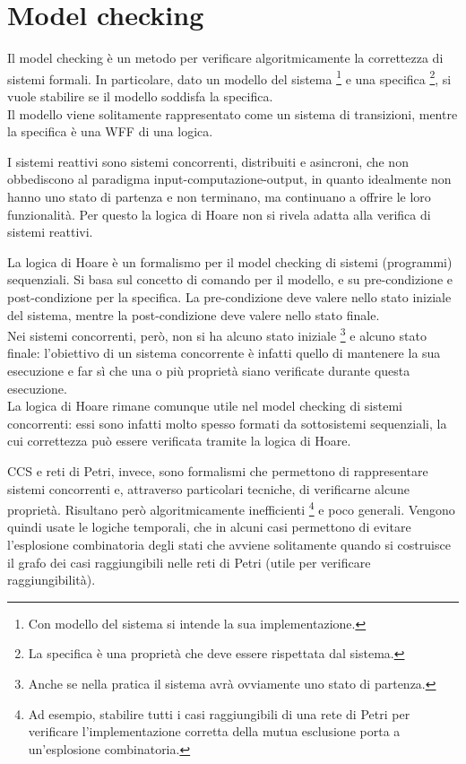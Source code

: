 \chapter{Model checking}
Il model checking è un metodo per verificare algoritmicamente la correttezza di
sistemi formali. In particolare, dato un modello del sistema \footnote{Con
modello del sistema si intende la sua implementazione.} e una specifica
\footnote{La specifica è una proprietà che deve essere rispettata dal sistema.},
si vuole stabilire se il modello soddisfa la specifica.\\
Il modello viene solitamente rappresentato come un sistema di transizioni,
mentre la specifica è una WFF di una logica.

I sistemi reattivi sono sistemi concorrenti, distribuiti e asincroni,
che non obbediscono al paradigma input-computazione-output, in quanto
idealmente non hanno uno stato di partenza e non terminano, ma continuano
a offrire le loro funzionalità.
Per questo la logica di Hoare non si rivela adatta alla verifica di
sistemi reattivi.

La logica di Hoare è un formalismo per il model checking di sistemi (programmi)
sequenziali. Si basa sul concetto di comando per il modello, e su
pre-condizione e post-condizione per la specifica. La pre-condizione deve
valere nello stato iniziale del sistema, mentre la post-condizione deve
valere nello stato finale.\\
Nei sistemi concorrenti, però, non si ha alcuno stato iniziale
\footnote{Anche se nella pratica il sistema avrà ovviamente uno stato di
partenza.} e alcuno stato finale: l'obiettivo di un sistema concorrente è
infatti quello di mantenere la sua esecuzione e far sì che una o più
proprietà siano verificate durante questa esecuzione.\\
La logica di Hoare rimane comunque utile nel model checking di sistemi
concorrenti: essi sono infatti molto spesso formati da sottosistemi
sequenziali, la cui correttezza può essere verificata tramite la logica
di Hoare.

CCS e reti di Petri, invece, sono formalismi che permettono di rappresentare
sistemi concorrenti e, attraverso particolari tecniche, di verificarne alcune
proprietà. Risultano però algoritmicamente inefficienti \footnote{Ad esempio,
stabilire tutti i casi raggiungibili di una rete di Petri per verificare
l'implementazione corretta della mutua esclusione porta a un'esplosione
combinatoria.} e poco generali.
Vengono quindi usate le logiche temporali, che in alcuni casi permettono di
evitare l'esplosione combinatoria degli stati che avviene solitamente
quando si costruisce il grafo dei casi raggiungibili nelle reti di Petri
(utile per verificare raggiungibilità).


